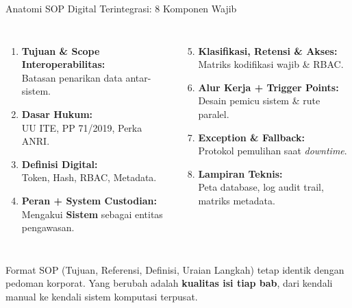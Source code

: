 \documentclass[aspectratio=169,11pt]{beamer}
\begin{document}
\begin{frame}{Anatomi SOP Digital Terintegrasi: 8 Komponen Wajib}
    \vspace{0.2cm}
    \begin{columns}[T]
        \scriptsize
        \begin{enumerate}
            \item \textbf{Tujuan \& Scope Interoperabilitas:}\\Batasan penarikan data antar-sistem.
            \item \textbf{Dasar Hukum:}\\UU ITE, PP 71/2019, Perka ANRI.
            \item \textbf{Definisi Digital:}\\Token, Hash, RBAC, Metadata.
            \item \textbf{Peran + System Custodian:}\\Mengakui \textbf{Sistem} sebagai entitas pengawasan.
        \end{enumerate}
        
        \scriptsize
        \begin{enumerate}\setcounter{enumi}{4}
            \item \textbf{Klasifikasi, Retensi \& Akses:}\\Matriks kodifikasi wajib \& RBAC.
            \item \textbf{Alur Kerja + Trigger Points:}\\Desain pemicu sistem \& rute paralel.
            \item \textbf{Exception \& Fallback:}\\Protokol pemulihan saat \textit{downtime}.
            \item \textbf{Lampiran Teknis:}\\Peta database, log audit trail, matriks metadata.
        \end{enumerate}
    \end{columns}
    \vspace{0.2cm}
    \begin{greenbox}
        \scriptsize Format SOP (Tujuan, Referensi, Definisi, Uraian Langkah) tetap identik dengan pedoman korporat. Yang berubah adalah \textbf{kualitas isi tiap bab}, dari kendali manual ke kendali sistem komputasi terpusat.
    \end{greenbox}
\end{frame}
\end{document}
